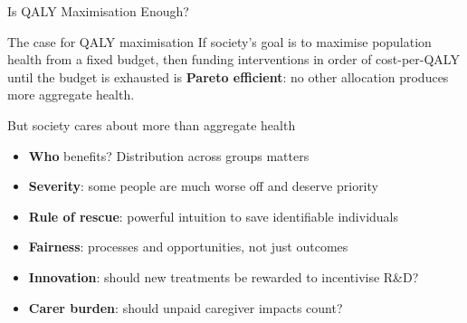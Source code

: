 \documentclass[aspectratio=169, 12pt]{beamer}
\begin{document}
\begin{frame}{Is QALY Maximisation Enough?}
  \begin{block}{The case for QALY maximisation}
    If society's goal is to maximise population health from a fixed budget, then funding
    interventions in order of cost-per-QALY until the budget is exhausted is \textbf{Pareto
    efficient}: no other allocation produces more aggregate health.
  \end{block}
  \vspace{0.3em}
  \begin{alertblock}{But society cares about more than aggregate health}
    \begin{itemize}
      \item \textbf{Who} benefits? Distribution across groups matters
      \item \textbf{Severity}: some people are much worse off and deserve priority
      \item \textbf{Rule of rescue}: powerful intuition to save identifiable individuals
      \item \textbf{Fairness}: processes and opportunities, not just outcomes
      \item \textbf{Innovation}: should new treatments be rewarded to incentivise R\&D?
      \item \textbf{Carer burden}: should unpaid caregiver impacts count?
    \end{itemize}
  \end{alertblock}
\end{frame}
\end{document}
